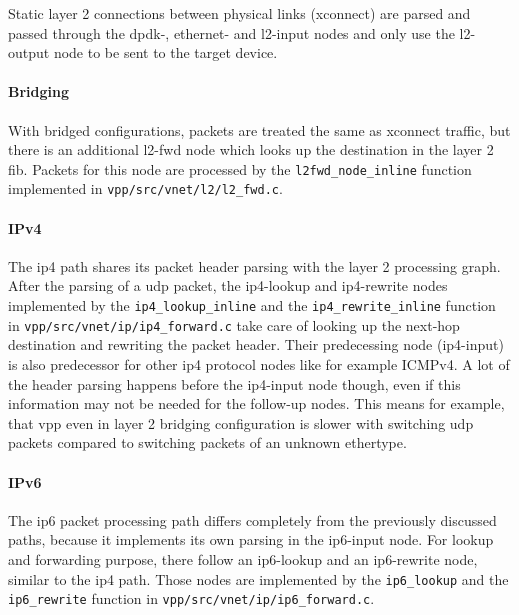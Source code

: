 Static layer 2 connections between physical links (xconnect) are
parsed and passed through the dpdk-, ethernet- and l2-input nodes and
only use the l2-output node to be sent to the target device.

\paragraph{Bridging}

With bridged configurations, packets are treated the same as xconnect
traffic, but there is an additional l2-fwd node which looks up the
destination in the layer 2 \Ac{fib}. Packets for this node are
processed by the \lstinline|l2fwd_node_inline| function implemented in
\lstinline|vpp/src/vnet/l2/l2_fwd.c|.

\paragraph{IPv4}
\label{sec:headerparsing} 

The \Ac{ip4} path shares its packet header parsing with the layer 2
processing graph. After the parsing of a \Ac{udp} packet, the
ip4-lookup and ip4-rewrite nodes implemented by the
\lstinline|ip4_lookup_inline| and the \lstinline|ip4_rewrite_inline|
function in \lstinline|vpp/src/vnet/ip/ip4_forward.c| take care of
looking up the next-hop destination and rewriting the packet header.
Their predecessing node (ip4-input) is also predecessor for other ip4
protocol nodes like for example ICMPv4. A lot of the header parsing
happens before the ip4-input node though, even if this information may
not be needed for the follow-up nodes. This means for example, that
\Ac{vpp} even in layer 2 bridging configuration is slower with
switching \Ac{udp} packets compared to switching packets of an unknown
ethertype.

\paragraph{IPv6}

The ip6 packet processing path differs completely from the previously
discussed paths, because it implements its own parsing in the
ip6-input node. For lookup and forwarding purpose, there follow an
ip6-lookup and an ip6-rewrite node, similar to the \Ac{ip4} path.
Those nodes are implemented by the \lstinline|ip6_lookup| and the
\lstinline|ip6_rewrite| function in
\lstinline|vpp/src/vnet/ip/ip6_forward.c|.

